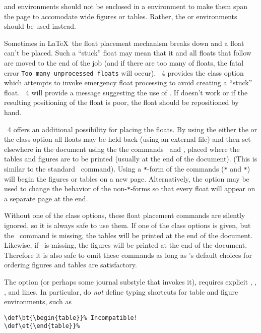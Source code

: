 \documentclass[%
 ,twocolumn%
 ,secnumarabic%
,amssymb, amsmath,nobibnotes, aps, prl]{revtex4}
\begin{document}
 and  environments should not 
be enclosed in a  environment to make them span
the page to accomodate wide figures or tables. Rather, the
 or  environments should be used instead.

Sometimes in \LaTeX\ the float placement mechanism breaks down and a
float can't be placed. Such a ``stuck'' float may mean that it and all
floats that follow are moved to the end of the job (and if there are
too many of floats, the fatal error \texttt{Too many unprocessed floats}
will occur). \revtex~4 provides the class option
 which attempts to invoke emergency float
processing to avoid creating a ``stuck'' float. \revtex~4 will provide
a message suggesting the use of
. If  doesn't work or if
the resulting positioning of the float is poor, the float should be
repositioned by hand.

\revtex~4 offers an additional possibility for placing the floats. By
using the either the  or the
 class option all floats may be held
back (using an external file) and then set elsewhere in the document
using the the commands \cmd\printtables\ and \cmd\printfigures{},
placed where the tables and figures are to be printed (usually at the
end of the document).  (This is similar to the standard
\cmd\printindex\ command). Using a \texttt{*}-form of the commands
(\cmd\printfigures\verb+*+ and
\cmd\printtables\verb+*+) will begin the figures
or tables on a new page. Alternatively, the option
 may be used to change the behavior of the
non-\texttt{*}-forms so that every float will appear on a separate
page at the end.

Without one of the  class options, these float
placement commands are silently ignored, so it is always safe to use
them.  If one of the  class options is given,
but the \cmd\printtables\ command is missing, the tables will be
printed at the end of the document. Likewise, if \cmd\printfigures\ is
missing, the figures will be printed at the end of the document.
Therefore it is also safe to omit these commands as long as \revtex's
default choices for ordering figures and tables are satisfactory.

The  option (or perhaps some journal substyle
that invokes it), requires explicit , ,
, and  lines. In particular, do \emph{not}
define typing shortcuts for table and figure environments, such as
\begin{verbatim}
\def\bt{\begin{table}}% Incompatible!
\def\et{\end{table}}%
\end{verbatim}
\end{document}
